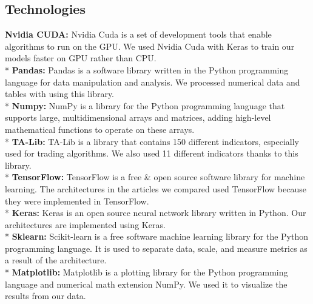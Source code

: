 \documentclass[]{article}
\begin{document}
\subsection{Technologies}
\textbf{Nvidia CUDA:} Nvidia Cuda is a set of development tools that enable algorithms to run on the GPU. We used Nvidia Cuda with Keras to train our models faster on GPU rather than CPU.\vspace{0.1cm}\\*
\textbf{Pandas:} Pandas is a software library written in the Python programming language for data manipulation and analysis. We processed numerical data and tables with using this library.\vspace{0.1cm}\\*
\textbf{Numpy:} NumPy is a library for the Python programming language that supports large, multidimensional arrays and matrices, adding high-level mathematical functions to operate on these arrays.\vspace{0.1cm}\\*
\textbf{TA-Lib:} TA-Lib is a library that contains 150 different indicators, especially used for trading algorithms. We also used 11 different indicators thanks to this library.\vspace{0.1cm}\\*
\textbf{TensorFlow:} TensorFlow is a free \& open source software library for machine learning. The architectures in the articles we compared used TensorFlow because they were implemented in TensorFlow.\vspace{0.1cm}\\*
\textbf{Keras:} Keras is an open source neural network library written in Python. Our architectures are implemented using Keras.\vspace{0.1cm}\\*
\textbf{Sklearn:} Scikit-learn is a free software machine learning library for the Python programming language. It is used to separate data, scale, and measure metrics as a result of the architecture.\vspace{0.1cm}\\*
\textbf{Matplotlib:} Matplotlib is a plotting library for the Python programming language and numerical math extension NumPy. We used it to visualize the results from our data.
\end{document}
